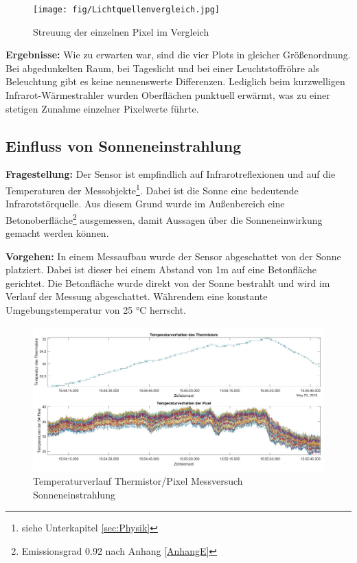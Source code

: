 \begin{figure}[H]
	\centering
	\texttt{[image: fig/Lichtquellenvergleich.jpg]}
	\caption[Streuung der einzelnen Pixel im Vergleich]{Streuung der einzelnen Pixel im Vergleich}
	\label{fig:Lichtwuellen2}
\end{figure}

\textbf{Ergebnisse:}  Wie zu erwarten war, sind die vier Plots in gleicher Größenordnung. Bei abgedunkelten Raum, bei Tageslicht und bei einer Leuchtstoffröhre als Beleuchtung gibt es keine nennenswerte Differenzen. Lediglich beim kurzwelligen Infrarot-Wärmestrahler wurden Oberflächen punktuell erwärmt, was zu einer stetigen Zunahme einzelner Pixelwerte führte. 

\subsection{Einfluss von  Sonneneinstrahlung}

\textbf{Fragestellung:} Der Sensor ist empfindlich auf Infrarotreflexionen und auf die Temperaturen der Messobjekte\footnote[17]{siehe Unterkapitel  \ref{sec:Physik}}. Dabei ist die Sonne eine bedeutende Infrarotstörquelle. Aus diesem Grund wurde im Außenbereich eine Betonoberfläche\footnote[18]{Emissionsgrad 0.92 nach Anhang \ref{AnhangE}} ausgemessen, damit Aussagen über die Sonneneinwirkung gemacht werden können. 

\textbf{Vorgehen:} In einem Messaufbau wurde der Sensor abgeschattet von der Sonne platziert. Dabei ist dieser bei einem Abstand von 1m auf eine Betonfläche gerichtet. Die Betonfläche wurde direkt von der Sonne bestrahlt und wird im Verlauf der Messung abgeschattet. Währendem eine konstante Umgebungstemperatur von 25 °C herrscht.  


\begin{figure}[H]
	\centering
	\includegraphics[width=1.0\textwidth]{fig/Temperaturverhalten2}
	\caption{Temperaturverlauf Thermistor/Pixel Messversuch Sonneneinstrahlung}
	\label{fig:temperaturverhalten2}
\end{figure}

